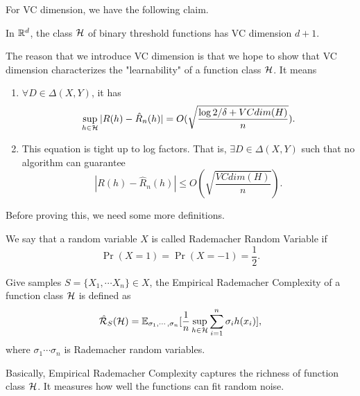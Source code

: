 \documentclass[../main.tex]{subfiles}
\begin{document}
	For VC dimension, we have the following claim.
	
	\begin{claim}
		In $\mathbb{R}^d$, the class $\mathcal{H}$ of binary threshold functions has VC dimension $d+1$.
	\end{claim}

	The reason that we introduce VC dimension is that we hope to show that VC dimension characterizes the "learnability" of a function class $\mathcal{H}$. It means
	
	\begin{enumerate}
		\item $\forall D \in \Delta(X,Y)$, it has
			\begin{equation*}
				\sup\limits_{h\in\mathcal{H}} |R(h) - \hat{R}_n (h)| =  O( \sqrt{\frac{\log 2 / \delta + VCdim(H)}{n}}).
			\end{equation*}
		\item This equation is tight up to log factors. That is, $\exists D\in  \Delta(X,Y)$ such that no algorithm can guarantee
			\begin{equation*}
				|R(h) - \hat{R}_n (h)| \leq O( \sqrt{\frac{ VCdim(H)}{n}}).
			\end{equation*}
	\end{enumerate}

	Before proving this, we need some more definitions.
	
	\begin{definition}
		We say that a random variable $X$ is called Rademacher Random Variable if 
			\begin{equation}
				\Pr(X= 1) = \Pr(X=-1) = \frac{1}{2}.
			\end{equation}
	\end{definition}
	
	\begin{definition}
		Give samples $S = \{X_1,\cdots X_n\} \in X$, the Empirical Rademacher Complexity of a function class $\mathcal{H}$ is defined as
			\begin{equation}
				\hat{\mathcal{R}}_S(\mathcal{H}) = \mathbb{E}_{\sigma_1,\cdots,\sigma_n} [\frac{1}{n} \sup\limits_{h\in \mathcal{H}} \sum\limits_{i=1}^n \sigma_i h(x_i)],
			\end{equation}
		where $\sigma_1\cdots \sigma_n$ is Rademacher random variables.
	\end{definition}

	Basically, Empirical Rademacher Complexity captures the richness of function class $\mathcal{H}$. It measures how well the functions can fit random noise.
	
\end{document}
